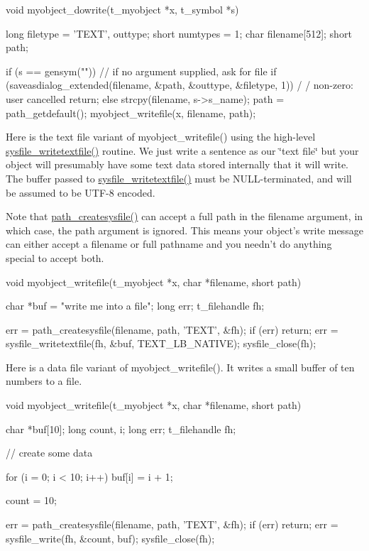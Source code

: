 \begin{DoxyCode}
    void myobject_dowrite(t_myobject *x, t_symbol *s)
    {
        long filetype = 'TEXT', outtype;
        short numtypes = 1;
        char filename[512];
        short path;

        if (s == gensym("")) {      // if no argument supplied, ask for file
            if (saveasdialog_extended(filename, &path, &outtype, &filetype, 1))     /
      / non-zero: user cancelled
                return;
        } else {
            strcpy(filename, s->s_name);
            path = path_getdefault();
        }
        myobject_writefile(x, filename, path);
    }
\end{DoxyCode}


Here is the text file variant of myobject\_\-writefile() using the high-\/level \hyperlink{group__files_gae07b391866ede8506eb046cf0dd0f17c}{sysfile\_\-writetextfile()} routine. We just write a sentence as our \char`\"{}text file\char`\"{} but your object will presumably have some text data stored internally that it will write. The buffer passed to \hyperlink{group__files_gae07b391866ede8506eb046cf0dd0f17c}{sysfile\_\-writetextfile()} must be NULL-\/terminated, and will be assumed to be UTF-\/8 encoded.

Note that \hyperlink{group__files_ga044310e9440119f12c57e9b985a9e1a3}{path\_\-createsysfile()} can accept a full path in the filename argument, in which case, the path argument is ignored. This means your object's write message can either accept a filename or full pathname and you needn't do anything special to accept both.


\begin{DoxyCode}
    void myobject_writefile(t_myobject *x, char *filename, short path)
    {
        char *buf = "write me into a file";
        long err;
        t_filehandle fh;

        err = path_createsysfile(filename, path, 'TEXT', &fh); 
        if (err)
            return;
        err = sysfile_writetextfile(fh, &buf, TEXT_LB_NATIVE);
        sysfile_close(fh);
    }
\end{DoxyCode}


Here is a data file variant of myobject\_\-writefile(). It writes a small buffer of ten numbers to a file.


\begin{DoxyCode}
    void myobject_writefile(t_myobject *x, char *filename, short path)
    {
        char *buf[10];
        long count, i;
        long err;
        t_filehandle fh;

        // create some data

        for (i = 0; i < 10; i++)
            buf[i] = i + 1;

        count = 10;

        err = path_createsysfile(filename, path, 'TEXT', &fh); 
        if (err)
            return;
        err = sysfile_write(fh, &count, buf);
        sysfile_close(fh);
    }
\end{DoxyCode}
 